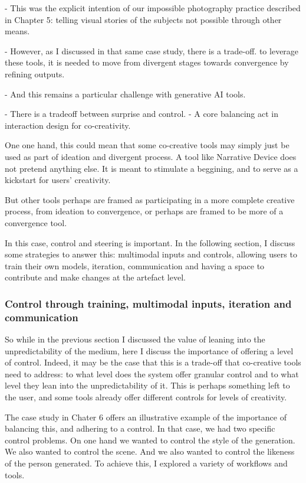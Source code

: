 - This was the explicit intention of our impossible photography practice described in Chapter 5: telling visual stories of the subjects not possible through other means. 

- However, as I discussed in that same case study, there is a trade-off. to leverage these tools, it is needed to move from divergent stages towards convergence by refining outputs. 

- And this remains a particular challenge with generative AI tools. 

- There is a tradeoff between surprise and control. 
- A core balancing act in interaction design for co-creativity. 

One one hand, this could mean that some co-creative tools may simply just be used as part of ideation and divergent process. A tool like Narrative Device does not pretend anything else. It is meant to stimulate a beggining, and to serve as a kickstart for users' creativity. 

But other tools perhaps are framed as participating in a more complete creative process, from ideation to convergence, or perhaps are framed to be more of a convergence tool. 

In this case, control and steering is important. In the following section, I discuss some strategies to answer this: multimodal inputs and controls, allowing users to train their own models, iteration, communication and having a space to contribute and make changes at the artefact level. 


\subsubsection{Control through training, multimodal inputs, iteration and communication}


So while in the previous section I discussed the value of leaning into the unpredictability of the medium, here I discuss the importance of offering a level of control. Indeed, it may be the case that this is a trade-off that co-creative tools need to address: to what level does the system offer granular control and to what level they lean into the unpredictability of it. This is perhaps something left to the user, and some tools already offer different controls for levels of creativity. 

The case study in Chater 6 offers an illustrative example of the importance of balancing this, and adhering to a control. In that case, we had two specific control problems. On one hand we wanted to control the style of the generation. We also wanted to control the scene. And we also wanted to control the likeness of the person generated. To achieve this, I explored a variety of workflows and tools. 


